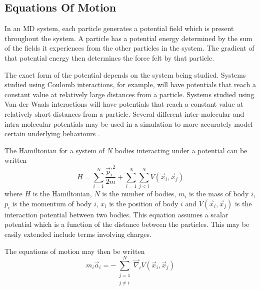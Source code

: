 \subsection{Equations Of Motion}

%
In an MD system, each particle generates a potential field
which is present throughout the system.
%
A particle has a potential energy determined by the sum
of the fields it experiences from the other particles in the system.
%
The gradient of that potential energy then determines
the force felt by that particle.

%
The exact form of the potential depends on the system being studied.
%
Systems studied using Coulomb interactions, for example,
will have potentials that reach a constant value at relatively large distances
from a particle.
%
Systems studied using Van der Waals interactions will have
potentials that reach a constant value at relatively short distances from
a particle.
%
Several different inter-molecular and intra-molecular potentials may be used
in a simulation to more accurately model certain underlying behaviours
\cite{smith1996dlpoly2}.


%
The Hamiltonian for a system of $N$ bodies
interacting under a \twobody{} potential can be written
\begin{equation}
    H = \sum_{i=1}^N \frac{\vec{p}_i^{,2}}{2 m}
        + \sum_{i=1}^N \sum_{j<i}^N V(\vec{x}_i, \vec{x}_j)
\end  {equation}
where $H$ is the Hamiltonian,
$N$ is the number of bodies,
$m_i$ is the mass of body $i$,
$p_i$ is the momentum of body $i$,
$x_i$ is the position of body $i$ and
$V(\vec{x}_i, \vec{x}_j)$ is the \twobody{} interaction potential
between two bodies.
%
This equation assumes a scalar potential which is
a function of the distance between the particles.
%
This may be easily extended include terms involving charges.

The equations of motion may then be written
\begin{equation}
    m_i \vec{a}_i = -\sum_{\substack{j=1\\j\ne{}i}}^N
                    \vec{\nabla}_i V(\vec{x}_i, \vec{x}_j)
\end  {equation}


